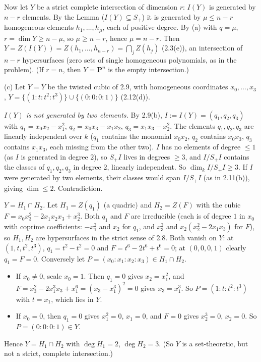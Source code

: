 \documentclass[11pt]{article}
\begin{document}
Now let $Y$ be a strict complete intersection of dimension $r$: $I(Y)$ is generated by $n-r$ elements. By the Lemma ($I(Y)\subseteq S_+$) it is generated by $\mu\le n-r$ homogeneous elements $h_1,\dots,h_\mu$, each of positive degree. By (a) with $q=\mu$, $r=\dim Y\ge n-\mu$, so $\mu\ge n-r$, hence $\mu=n-r$. Then $Y=Z(I(Y))=Z(h_1,\dots,h_{n-r})=\bigcap_jZ(h_j)$ (2.3(e)), an intersection of $n-r$ hypersurfaces (zero sets of single homogeneous polynomials, as in the problem). (If $r=n$, then $Y=\mathbf P^n$ is the empty intersection.)

(c) Let $Y=\overline Y$ be the twisted cubic of 2.9, with homogeneous coordinates $x_0,\dots,x_3$, $Y=\{(1:t:t^2:t^3)\}\cup\{(0:0:0:1)\}$ (2.12(d)).

\emph{$I(Y)$ is not generated by two elements.} By 2.9(b), $I:=I(Y)=(q_1,q_2,q_3)$ with $q_1=x_0x_2-x_1^2$, $q_2=x_0x_3-x_1x_2$, $q_3=x_1x_3-x_2^2$. The elements $q_1,q_2,q_3$ are linearly independent over $k$ ($q_1$ contains the monomial $x_0x_2$, $q_2$ contains $x_0x_3$, $q_3$ contains $x_1x_3$, each missing from the other two). $I$ has no elements of degree $\le1$ (as $I$ is generated in degree $2$), so $S_+I$ lives in degrees $\ge3$, and $I/S_+I$ contains the classes of $q_1,q_2,q_3$ in degree $2$, linearly independent. So $\dim_kI/S_+I\ge3$. If $I$ were generated by two elements, their classes would span $I/S_+I$ (as in 2.11(b)), giving $\dim\le2$. Contradiction.

\emph{$Y=H_1\cap H_2$.} Let $H_1=Z(q_1)$ (a quadric) and $H_2=Z(F)$ with the cubic $F=x_0x_3^2-2x_1x_2x_3+x_2^3$. Both $q_1$ and $F$ are irreducible (each is of degree $1$ in $x_0$ with coprime coefficients: $-x_1^2$ and $x_2$ for $q_1$, and $x_3^2$ and $x_2(x_2^2-2x_1x_3)$ for $F$), so $H_1,H_2$ are hypersurfaces in the strict sense of 2.8. Both vanish on $Y$: at $(1,t,t^2,t^3)$, $q_1=t^2-t^2=0$ and $F=t^6-2t^6+t^6=0$; at $(0,0,0,1)$ clearly $q_1=F=0$. Conversely let $P=(x_0:x_1:x_2:x_3)\in H_1\cap H_2$.
\begin{itemize}
\item If $x_0\ne0$, scale $x_0=1$. Then $q_1=0$ gives $x_2=x_1^2$, and $F=x_3^2-2x_1^3x_3+x_1^6=(x_3-x_1^3)^2=0$ gives $x_3=x_1^3$. So $P=(1:t:t^2:t^3)$ with $t=x_1$, which lies in $Y$.
\item If $x_0=0$, then $q_1=0$ gives $x_1^2=0$, $x_1=0$, and $F=0$ gives $x_2^3=0$, $x_2=0$. So $P=(0:0:0:1)\in Y$.
\end{itemize}
Hence $Y=H_1\cap H_2$ with $\deg H_1=2$, $\deg H_2=3$. (So $Y$ is a set-theoretic, but not a strict, complete intersection.)
\end{document}
